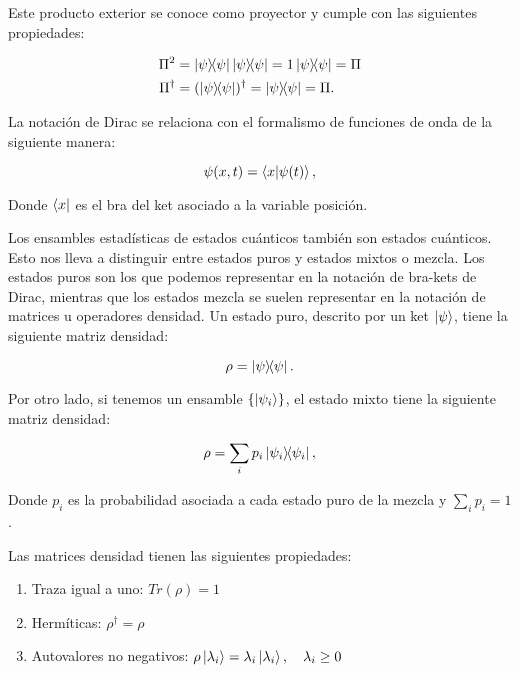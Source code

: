 Este producto exterior se conoce como proyector y cumple con las siguientes propiedades:

\begin{align}
    \Pi^2 &= \ketbra{\psi}{\psi} \ketbra{\psi}{\psi} = 1 \ketbra{\psi}{\psi} = \Pi \\
    \Pi^\dagger &= (\ketbra{\psi}{\psi})^\dagger = \ketbra{\psi}{\psi} = \Pi .
\end{align}

La notación de Dirac se relaciona con el formalismo de funciones de onda de la siguiente manera:

\begin{equation}
    \psi(x, t) = \braket{x}{\psi(t)} ,
\end{equation}

Donde $\bra{x}$ es el bra del ket asociado a la variable posición.

Los ensambles estadísticas de estados cuánticos también son estados cuánticos. Esto nos lleva a distinguir entre estados puros y estados mixtos o mezcla. Los estados puros son los que podemos representar en la notación de bra-kets de Dirac, mientras que los estados mezcla se suelen representar en la notación de matrices u operadores densidad. Un estado puro, descrito por un ket $\ket{\psi}$, tiene la siguiente matriz densidad:

\begin{equation}
    \rho = \ketbra{\psi}{\psi} .
\end{equation}

Por otro lado, si tenemos un ensamble $\{\ket{\psi_i}\}$, el estado mixto tiene la siguiente matriz densidad:

\begin{equation}
    \rho = \sum_i p_i \ketbra{\psi_i}{\psi_i} ,
\end{equation}

Donde $p_i$ es la probabilidad asociada a cada estado puro de la mezcla y $\sum_i p_i = 1$.

Las matrices densidad tienen las siguientes propiedades:

\begin{enumerate}
    \item Traza igual a uno: $Tr(\rho) = 1$
    \item Hermíticas: $\rho^\dagger = \rho$
    \item Autovalores no negativos: $\rho \ket{\lambda_i} = \lambda_i \ket{\lambda_i}, \quad \lambda_i \geq 0$
\end{enumerate}

